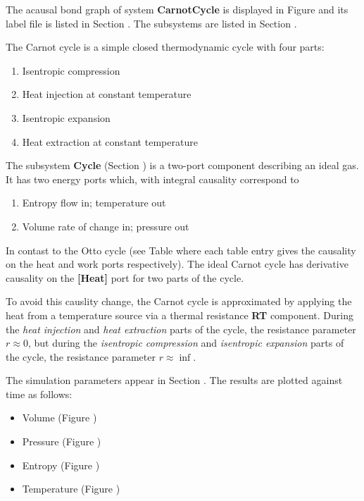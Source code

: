 

   The acausal bond graph of system \textbf{CarnotCycle} is
   displayed in Figure  and its label
   file is listed in Section .
   The subsystems are listed in Section .

The Carnot cycle is a simple closed thermodynamic cycle with four parts:
\begin{enumerate}
\item Isentropic compression
\item Heat injection at constant temperature
\item Isentropic expansion
\item Heat extraction at constant temperature
\end{enumerate}

The subsystem \textbf{Cycle} (Section ) is a two-port
component describing an ideal gas. It has two energy ports which, with
integral causality correspond to
\begin{enumerate}
\item Entropy flow in; temperature out
\item Volume rate of change in; pressure out
\end{enumerate}

In contast to the Otto cycle (see Table
 where each table entry gives the causality on the
heat and work ports respectively). The ideal Carnot cycle has
derivative causality on the {\bf [Heat]} port for two parts of the
cycle.

To avoid this causlity change, the Carnot cycle is approximated by
applying the heat from a temperature source via a thermal resistance
{\bf RT} component. During the {\em heat injection\/} and {\em heat
extraction\/} parts of the cycle, the resistance parameter $r\approx
0$, but during the {\em isentropic compression\/} and {\em isentropic
expansion\/} parts of the cycle, the resistance parameter $r\approx
\inf$.

The simulation parameters appear in Section
. The results are plotted against time
as follows:
\begin{itemize}
\item Volume (Figure )
\item Pressure (Figure
)
\item Entropy (Figure )
\item Temperature (Figure
)
\end{itemize}

